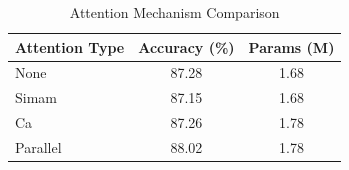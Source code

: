 
\begin{table}[h]
\centering
\caption{Attention Mechanism Comparison}
\label{tab:attention}
\begin{tabular}{lcc}
\toprule
Attention Type & Accuracy (\%) & Params (M) \\
\midrule
None & 87.28 & 1.68 \\
Simam & 87.15 & 1.68 \\
Ca & 87.26 & 1.78 \\
Parallel & 88.02 & 1.78 \\
\bottomrule
\end{tabular}
\end{table}
